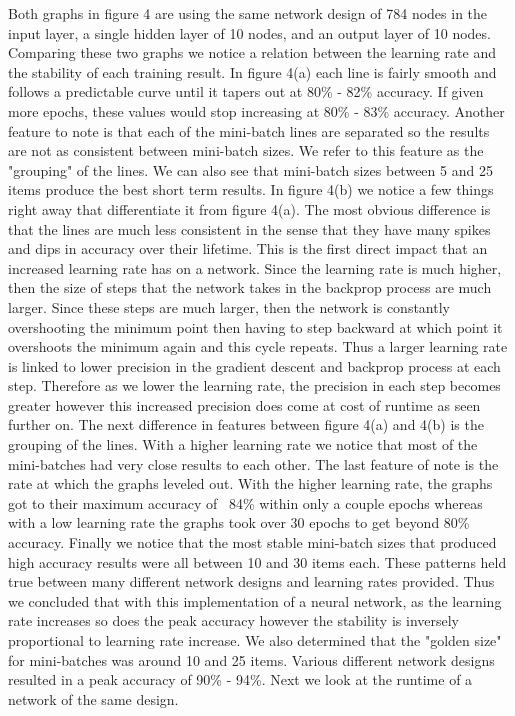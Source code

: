 \documentclass[12pt]{article}
\theoremstyle{definition}
\theoremstyle{plain}
\begin{document}
Both graphs in figure 4 are using the same network design of 784 nodes in the input layer, a single hidden layer of 10 nodes, and an output layer of 10 nodes. Comparing these two graphs we notice a relation between the learning rate and the stability of each training result. In figure 4(a) each line is fairly smooth and follows a predictable curve until it tapers out at 80\% \-- 82\% accuracy. If given more epochs, these values would stop increasing at 80\% \-- 83\% accuracy. Another feature to note is that each of the mini-batch lines are separated so the results are not as consistent between mini-batch sizes. We refer to this feature as the "grouping" of the lines. We can also see that mini-batch sizes between 5 and 25 items produce the best short term results. In figure 4(b) we notice a few things right away that differentiate it from figure 4(a). The most obvious difference is that the lines are much less consistent in the sense that they have many spikes and dips in accuracy over their lifetime. This is the first direct impact that an increased learning rate has on a network. Since the learning rate is much higher, then the size of steps that the network takes in the backprop process are much larger. Since these steps are much larger, then the network is constantly overshooting the minimum point then having to step backward at which point it overshoots the minimum again and this cycle repeats. Thus a larger learning rate is linked to lower precision in the gradient descent and backprop process at each step. Therefore as we lower the learning rate, the precision in each step becomes greater however this increased precision does come at cost of runtime as seen further on. The next difference in features between figure 4(a) and 4(b) is the grouping of the lines. With a higher learning rate we notice that most of the mini-batches had very close results to each other. The last feature of note is the rate at which the graphs leveled out. With the higher learning rate, the graphs got to their maximum accuracy of ~84\% within only a couple epochs whereas with a low learning rate the graphs took over 30 epochs to get beyond 80\% accuracy. Finally we notice that the most stable mini-batch sizes that produced high accuracy results were all between 10 and 30 items each. These patterns held true between many different network designs and learning rates provided. Thus we concluded that with this implementation of a neural network, as the learning rate increases so does the peak accuracy however the stability is inversely proportional to learning rate increase. We also determined that the "golden size" for mini-batches was around 10 and 25 items. Various different network designs resulted in a peak accuracy of 90\% \-- 94\%. Next we look at the runtime of a network of the same design.
\end{document}

